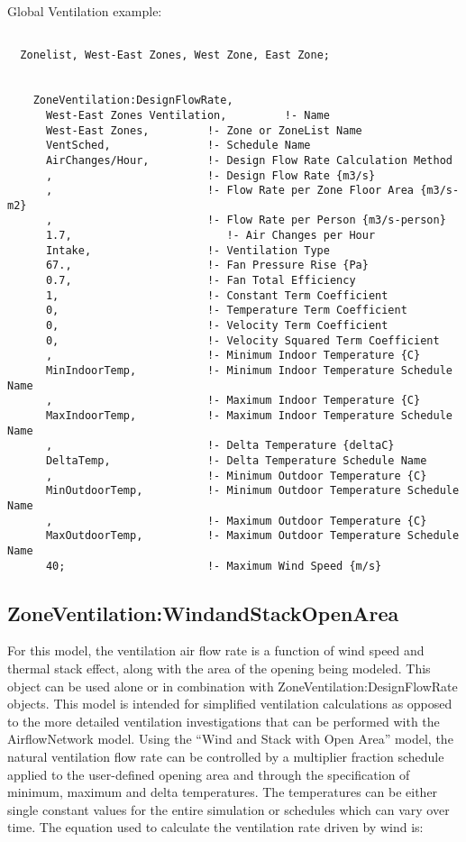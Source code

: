 Global Ventilation example:

\begin{lstlisting}

  Zonelist, West-East Zones, West Zone, East Zone;


    ZoneVentilation:DesignFlowRate,
      West-East Zones Ventilation,         !- Name
      West-East Zones,         !- Zone or ZoneList Name
      VentSched,               !- Schedule Name
      AirChanges/Hour,         !- Design Flow Rate Calculation Method
      ,                        !- Design Flow Rate {m3/s}
      ,                        !- Flow Rate per Zone Floor Area {m3/s-m2}
      ,                        !- Flow Rate per Person {m3/s-person}
      1.7,                        !- Air Changes per Hour
      Intake,                  !- Ventilation Type
      67.,                     !- Fan Pressure Rise {Pa}
      0.7,                     !- Fan Total Efficiency
      1,                       !- Constant Term Coefficient
      0,                       !- Temperature Term Coefficient
      0,                       !- Velocity Term Coefficient
      0,                       !- Velocity Squared Term Coefficient
      ,                        !- Minimum Indoor Temperature {C}
      MinIndoorTemp,           !- Minimum Indoor Temperature Schedule Name
      ,                        !- Maximum Indoor Temperature {C}
      MaxIndoorTemp,           !- Maximum Indoor Temperature Schedule Name
      ,                        !- Delta Temperature {deltaC}
      DeltaTemp,               !- Delta Temperature Schedule Name
      ,                        !- Minimum Outdoor Temperature {C}
      MinOutdoorTemp,          !- Minimum Outdoor Temperature Schedule Name
      ,                        !- Maximum Outdoor Temperature {C}
      MaxOutdoorTemp,          !- Maximum Outdoor Temperature Schedule Name
      40;                      !- Maximum Wind Speed {m/s}
\end{lstlisting}

\subsection{ZoneVentilation:WindandStackOpenArea}\label{zoneventilationwindandstackopenarea}

For this model, the ventilation air flow rate is a function of wind speed and thermal stack effect, along with the area of the opening being modeled. This object can be used alone or in combination with ZoneVentilation:DesignFlowRate objects. This model is intended for simplified ventilation calculations as opposed to the more detailed ventilation investigations that can be performed with the AirflowNetwork model. Using the ``Wind and Stack with Open Area'' model, the natural ventilation flow rate can be controlled by a multiplier fraction schedule applied to the user-defined opening area and through the specification of minimum, maximum and delta temperatures. The temperatures can be either single constant values for the entire simulation or schedules which can vary over time. The equation used to calculate the ventilation rate driven by wind is:

